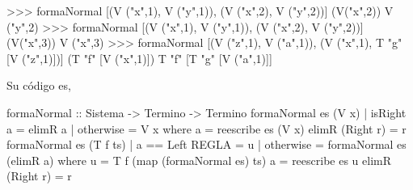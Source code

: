 \begin{sesion}
>>> formaNormal [(V ("x",1), V ("y",1)),
                   (V ("x",2), V ("y",2))]
                   (V("x",2))
V ("y",2)
>>> formaNormal [(V ("x",1), V ("y",1)),
                   (V ("x",2), V ("y",2))]
                   (V("x",3))
V ("x",3)
>>> formaNormal [(V ("z",1), V ("a",1)),
                   (V ("x",1), T "g" [V ("z",1)])]
                   (T "f" [V ("x",1)])
T "f" [T "g" [V ("a",1)]]
\end{sesion}

Su código es,
\begin{codigo}
formaNormal :: Sistema -> Termino -> Termino
formaNormal es (V x)
  | isRight a = elimR a
  | otherwise = V x
  where a = reescribe es (V x)
        elimR (Right r) = r
formaNormal es (T f ts)
  | a == Left REGLA = u
  | otherwise       = formaNormal es (elimR a)
  where u = T f (map (formaNormal es) ts)
        a = reescribe es u
        elimR (Right r) = r
\end{codigo}






 
